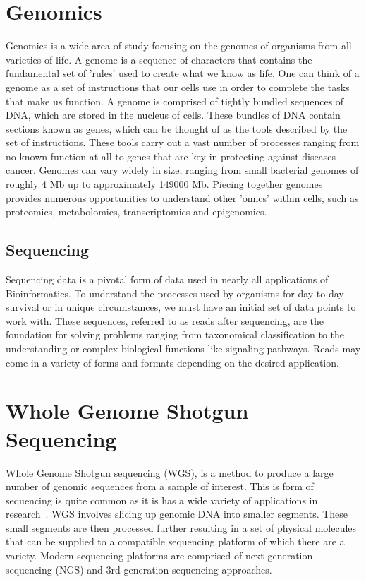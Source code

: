 \section{Genomics}
Genomics is a wide area of study focusing on the genomes of organisms
from all varieties of life. A genome is a sequence of characters that
contains the fundamental set of 'rules' used to create what we know as
life. One can think of a genome as a set of instructions that our
cells use in order to complete the tasks that make us function. A
genome is comprised of tightly bundled sequences of DNA, which are
stored in the nucleus of cells. These bundles of DNA contain sections
known as genes, which can be thought of as the tools described by the
set of instructions. These tools carry out a vast number of processes
ranging from no known function at all to genes that are key in
protecting against diseases cancer. Genomes can vary widely in size,
ranging from small bacterial genomes of roughly 4 Mb up to
approximately 149000 Mb. Piecing together genomes provides numerous
opportunities to understand other 'omics' within cells, such as
proteomics, metabolomics, transcriptomics and epigenomics.

\subsection{Sequencing}
Sequencing data is a pivotal form of data used in nearly all
applications of Bioinformatics. To understand the processes used by
organisms for day to day survival or in unique circumstances, we must
have an initial set of data points to work with. These sequences,
referred to as reads after sequencing, are the foundation for solving
problems ranging from taxonomical classification to the understanding
or complex biological functions like signaling pathways. Reads may
come in a variety of forms and formats depending on the desired
application.

\section{Whole Genome Shotgun Sequencing}
Whole Genome Shotgun sequencing (WGS), is a method to produce a large
number of genomic sequences from a sample of interest. This is form of
sequencing is quite common as it is has a wide variety of applications
in research~\cite{Adams2008}. WGS involves slicing up genomic DNA into
smaller segments. These small segments are then processed further
resulting in a set of physical molecules that can be supplied to a
compatible sequencing platform of which there are a variety. Modern
sequencing platforms are comprised of next generation sequencing (NGS)
and 3rd generation sequencing approaches.

